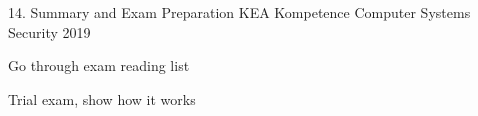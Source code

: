 \documentclass[Screen16to9,17pt]{foils}
\begin{document}
\mytitlepage
{14. Summary and Exam Preparation}
{KEA Kompetence Computer Systems Security 2019}




\begin{list1}
\item Go through exam reading list
\item Trial exam, show how it works
\end{list1}
\end{document}
